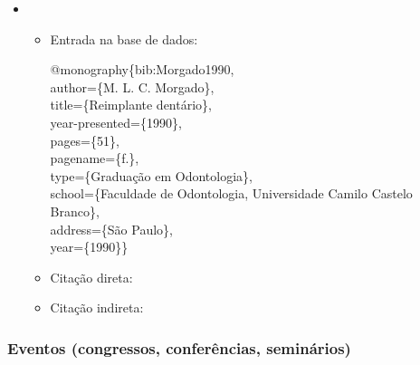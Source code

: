 \documentclass[a4paper,12pt,oneside,onecolumn]{uerj/uerj}
\newcommand{\formato}[1]{\begin{flushleft}{#1}\end{flushleft}}
\begin{document}
\begin{itemize}[label={Ex.:},leftmargin=\parindent,parsep=0pt,itemsep=0pt]
  \item \formato{\citetext{bib:Morgado1990}}

  \begin{itemize}[leftmargin=*,parsep=0pt,itemsep=0pt]
    \item Entrada na base de dados:

    \formato{
      @monography\{bib:Morgado1990,\\
      author=\{M. L. C. Morgado\},\\
      title=\{Reimplante dent\'ario\},\\
      year-presented=\{1990\},\\
      pages=\{51\},\\
      pagename=\{f.\},\\
      type=\{Gradua{\c c}\~ao em Odontologia\},\\
      school=\{Faculdade de Odontologia, Universidade Camilo Castelo Branco\},\\
      address=\{S\~ao Paulo\},\\
      year=\{1990\}\}\\
    }

    \item Citação direta: 
    \item Citação indireta: \cite{bib:Morgado1990}
  \end{itemize}
\end{itemize}

\subsubsection{Eventos (congressos, conferências, seminários)}
\end{document}

